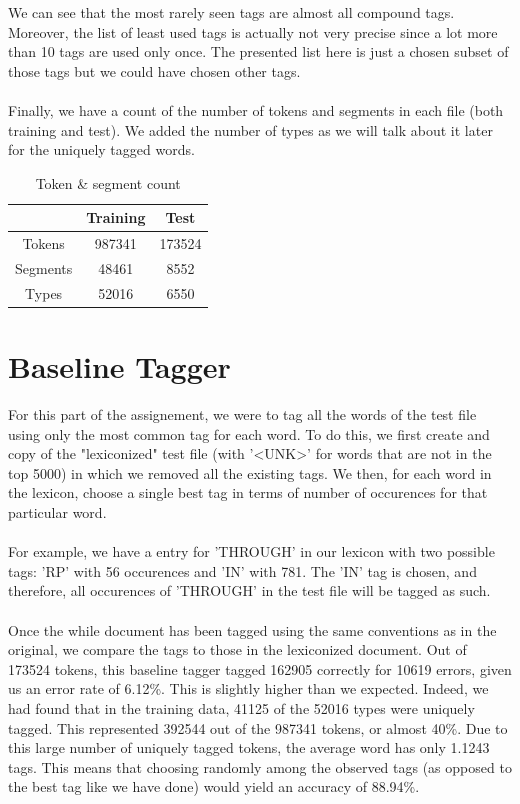 \documentclass[10pt, a4paper, oneside]{article} %
\begin{document}
We can see that the most rarely seen tags are almost all compound tags. Moreover, the list of least used tags is actually not very precise since a lot more than 10 tags are used only once. The presented list here is just a chosen subset of those tags but we could have chosen other tags. 

\paragraph*{} Finally, we have a count of the number of tokens and segments in each file (both training and test). We added the number of types as we will talk about it later for the uniquely tagged words.

\begin{table}[!h]
\centering
\begin{tabular}{ | c | c | c | }
\hline
& Training & Test \\ \hline
Tokens & 987341 & 173524 \\ 
Segments & 48461 & 8552 \\
Types & 52016 & 6550\\ \hline
\end{tabular}
\caption{Token \& segment count}
\label{count}
\end{table}

\section{Baseline Tagger}
For this part of the assignement, we were to tag all the words of the test file using only the most common tag for each word. To do this, we first create and copy of the "lexiconized" test file (with '<UNK>' for words that are not in the top 5000) in which we removed all the existing tags. We then, for each word in the lexicon, choose a single best tag in terms of number of occurences for that particular word. 

\paragraph*{}For example, we have a entry for 'THROUGH' in our lexicon with two possible tags: 'RP' with 56 occurences and 'IN' with 781. The 'IN' tag is chosen, and therefore, all occurences of 'THROUGH' in the test file will be tagged as such.

\paragraph*{}Once the while document has been tagged using the same conventions as in the original, we compare the tags to those in the lexiconized document. Out of 173524 tokens, this baseline tagger tagged 162905 correctly for 10619 errors, given us an error rate of 6.12\%. This is slightly higher than we expected. Indeed, we had found that in the training data, 41125 of the 52016 types were uniquely tagged. This represented 392544 out of the 987341 tokens, or almost 40\%. Due to this large number of uniquely tagged tokens, the average word has only 1.1243 tags. This means that choosing randomly among the observed tags (as opposed to the best tag like we have done) would yield an accuracy of 88.94\%.
\end{document}
